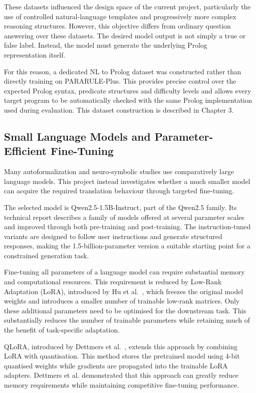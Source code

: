 \documentclass[11pt]{article} %
\theoremstyle{plain}
\theoremstyle{definition}
\begin{document}
These datasets influenced the design space of the current project,
particularly the use of controlled natural-language templates and progressively
more complex reasoning structures. However, this objective differs from
ordinary question answering over these datasets. The desired model output is
not simply a true or false label. Instead, the model must generate the
underlying Prolog representation itself.

For this reason, a dedicated NL to Prolog dataset was constructed rather than
directly training on PARARULE-Plus. This provides precise control over the
expected Prolog syntax, predicate structures and difficulty levels and allows
every target program to be automatically checked with the same Prolog
implementation used during evaluation. This dataset construction is described
in Chapter 3.


\subsection{Small Language Models and Parameter-Efficient Fine-Tuning}

Many autoformalization and neuro-symbolic studies use comparatively large
language models. This project instead investigates whether a much smaller model
can acquire the required translation behaviour through targeted fine-tuning.

The selected model is Qwen2.5-1.5B-Instruct, part of the Qwen2.5 family. Its
technical report describes a family of models offered at several parameter
scales and improved through both pre-training and post-training. The
instruction-tuned variants are designed to follow user instructions and
generate structured responses, making the 1.5-billion-parameter version a
suitable starting point for a constrained generation task.

Fine-tuning all parameters of a language model can require substantial memory
and computational resources. This requirement is reduced by Low-Rank
Adaptation (LoRA), introduced by Hu et al.~\cite{hu2021lora}, which freezes the original
model weights and introduces a smaller number of trainable low-rank matrices.
Only these additional parameters need to be optimised for the downstream task.
This substantially reduces the number of trainable parameters while retaining
much of the benefit of task-specific adaptation.

QLoRA, introduced by Dettmers et al.~\cite{dettmers2023qlora}, extends this
approach by combining LoRA with quantisation. This method stores the pretrained model using 4-bit
quantised weights while gradients are propagated into the trainable LoRA
adapters. Dettmers et al. demonstrated that this approach can greatly reduce
memory requirements while maintaining competitive fine-tuning performance.
\end{document}

